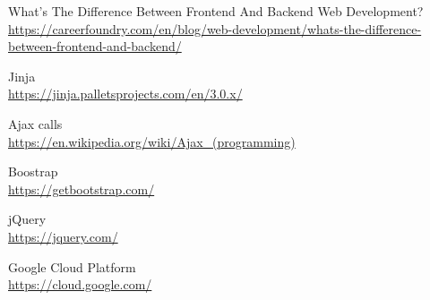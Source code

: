 \documentclass[11pt,a4paper,english]{article}
\begin{document}
\begin{thebibliography}{99}
What's The Difference Between Frontend And Backend Web Development?
\\\url{https://careerfoundry.com/en/blog/web-development/whats-the-difference-between-frontend-and-backend/}

Jinja
\\\url{https://jinja.palletsprojects.com/en/3.0.x/}

Ajax calls
\\\url{https://en.wikipedia.org/wiki/Ajax_(programming)}

Boostrap
\\\url{https://getbootstrap.com/}

jQuery
\\\url{https://jquery.com/}

Google Cloud Platform
\\\url{https://cloud.google.com/}


\end{thebibliography}
\end{document}
